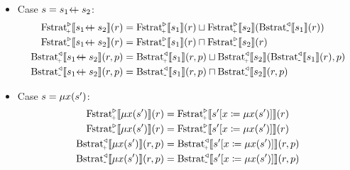 \documentclass{article}
\newcommand{\minus}{{\scalebox{0.9}{-}}}
\newcommand{\plus}{{\scalebox{0.6}{\!+}}}
\newcommand{\leftchoice}[2]{\ensuremath #1 \mathrel{\vcenter{\hbox{+}}\mkern-18.5mu{\leftarrow}} #2}
\newcommand{\fix}[2]{\ensuremath \mu #1 (#2)}
\newcommand{\Fstratam}[1]{\ensuremath \text{Fstrat}^\triangleright_\minus \llbracket #1 \rrbracket}
\newcommand{\Fstratap}[1]{\ensuremath \text{Fstrat}^\triangleright_\plus \llbracket #1 \rrbracket}
\newcommand{\Bstratap}[1]{\ensuremath \text{Bstrat}_\plus^\triangleleft \llbracket #1 \rrbracket}
\newcommand{\Bstratam}[1]{\ensuremath \text{Bstrat}_\minus^\triangleleft \llbracket #1 \rrbracket}
\begin{document}
\begin{itemize}
\item Case $s = \leftchoice{s_1}{s_2}$:
  \begin{align*}
    \Fstratap{\leftchoice{s_1}{s_2}}(r) &= \Fstratap{s_1}(r) \sqcup \Fstratap{s_2}(\Bstratam{s_1}(r)) \\
    \Fstratam{\leftchoice{s_1}{s_2}}(r) &= \Fstratam{s_1}(r) \sqcap \Fstratam{s_2}(r) \\
    \Bstratap{\leftchoice{s_1}{s_2}}(r,p) &= \Bstratap{s_1}(r,p) \sqcup \Bstratap{s_2}(\Bstratam{s_1}(r),p) \\
    \Bstratam{\leftchoice{s_1}{s_2}}(r,p) &= \Bstratam{s_1}(r,p) \sqcap \Bstratam{s_2}(r,p)
  \end{align*}

\item Case $s = \fix{x}{s'}$:
  \begin{align*}
    \Fstratap{\fix{x}{s'}}(r) &= \Fstratap{s'[x \coloneqq \fix{x}{s'}]}(r) \\
    \Fstratam{\fix{x}{s'}}(r) &= \Fstratam{s'[x \coloneqq \fix{x}{s'}]}(r) \\
    \Bstratap{\fix{x}{s'}}(r,p) &= \Bstratap{s'[x \coloneqq \fix{x}{s'}]}(r,p) \\
    \Bstratam{\fix{x}{s'}}(r,p) &= \Bstratam{s'[x \coloneqq \fix{x}{s'}]}(r,p)
  \end{align*}


\end{itemize}
\end{document}
